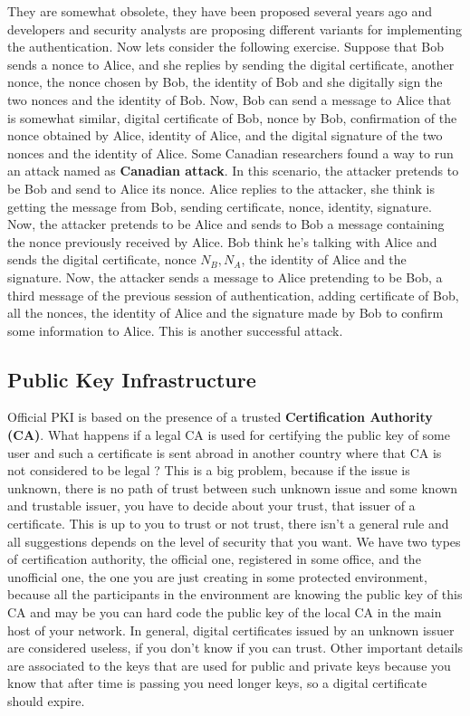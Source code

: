 \documentclass[11pt]{article}
\begin{document}
They are somewhat obsolete, they have been proposed several years ago and developers and security analysts are proposing different variants for implementing the authentication. Now lets consider the following exercise. Suppose that Bob sends a nonce to Alice, and she replies by sending the digital certificate, another nonce, the nonce chosen by Bob, the identity of Bob and she digitally sign the two nonces and the identity of Bob. Now, Bob can send a message to Alice that is somewhat similar, digital certificate of Bob, nonce by Bob, confirmation of the nonce obtained by Alice, identity of Alice, and the digital signature of the two nonces and the identity of Alice. Some Canadian researchers found a way to run an attack named as \textbf{Canadian attack}. In this scenario, the attacker pretends to be Bob and send to Alice its nonce. Alice replies to the attacker, she think is getting the message from Bob, sending certificate, nonce, identity, signature. Now, the attacker pretends to be Alice and sends to Bob a message containing the nonce previously received by Alice. Bob think he's talking with Alice and sends the digital certificate, nonce $N_B, N_A$, the identity of Alice and the signature. Now, the attacker sends a message to Alice pretending to be Bob, a third message of the previous session of authentication, adding certificate of Bob, all the nonces, the identity of Alice and the signature made by Bob to confirm some information to Alice. This is another successful attack.
\subsection{Public Key Infrastructure}
Official PKI is based on the presence of a trusted \textbf{Certification Authority (CA)}. What happens if a legal CA is used for certifying the public key of some user and such a certificate is sent abroad in another country where that CA is not considered to be legal ?  This is a big problem, because if the issue is unknown, there is no path of trust between such unknown issue and some known and trustable issuer, you have to decide about your trust, that issuer of a certificate. This is up to you to trust or not trust, there isn't a general rule and all suggestions depends on the level of security that you want. We have two types of certification authority, the official one, registered in some office, and the unofficial one, the one you are just creating in some protected environment, because all the participants in the environment are knowing the public key of this CA and may be you can hard code the public key of the local CA in the main host of your network. In general, digital certificates issued by an unknown issuer are considered useless, if you don't know if you can trust. Other important details are associated to the keys that are used for public and private keys because you know that after time is passing you need longer keys, so a digital certificate should expire.
\end{document}
